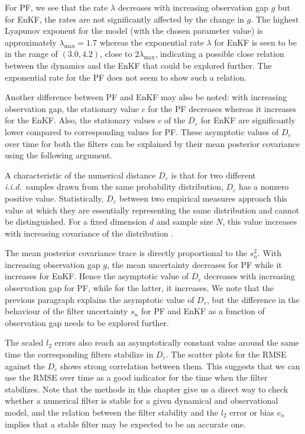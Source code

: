 For PF, we see that the rate $\lambda$ decreases with increasing observation gap $g$ but for EnKF, the rates are not significantly affected by the change in $g$. The highest Lyapunov exponent for the model (with the chosen parameter value) is approximately $\lambda_{\text{max}} = 1.7$ whereas the exponential rate $\lambda$ for EnKF is seen to be in the range of $(3.0, 4.2)$, close to $2 \lambda_{\text{max}}$, indicating a possible close relation between the dynamics and the EnKF that could be explored further. The exponential rate for the PF does not seem to show such a relation.

Another difference between PF and EnKF may also be noted: with increasing observation gap, the stationary value $c$ for the PF decreases whereas it increases for the EnKF. Also, the stationary values $c$ of the $D_\varepsilon$ for EnKF are significantly lower compared to corresponding values for PF. These asymptotic values of $D_\varepsilon$ over time for both the filters can be explained by their mean posterior covariance using the following argument.

A characteristic of the numerical distance $D_\varepsilon$ is that for two different {\it i.i.d.}~samples drawn from the same probability distribution, $D_\varepsilon$ has a nonzero positive value. Statistically, $D_\varepsilon$ between two empirical measures approach this value at which they are essentially representing the same distribution and cannot be distinguished. For a fixed dimension $d$ and sample size $N$, this value increases with increasing covariance of the distribution \cite[Figure~1 and discussion therein]{mandal2021stability}.

The mean posterior covariance trace is directly proportional to the $s_n^2$. With increasing observation gap $g$, the mean uncertainty decreases for PF while it increases for EnKF. Hence the asymptotic value of $D_\varepsilon$ decreases with increasing observation gap for PF, while for the latter, it increases. We note that the previous paragraph explains the asymptotic value of $D_\varepsilon$, but the difference in the behaviour of the filter uncertainty $s_n$ for PF and EnKF as a function of observation gap needs to be explored further.

The scaled $l_2$ errors also reach an asymptotically constant value around the same time the corresponding filters stabilize in $D_\varepsilon$. The scatter plots for the RMSE against the $D_\varepsilon$ shows strong correlation between them. This suggests that we can use the RMSE over time as a good indicator for the time when the filter stabilizes. Note that the methods in this chapter give us a direct way to check whether a numerical filter is stable for a given dynamical and observational model, and the relation between the filter stability and the $l_2$ error or bias $e_n$ implies that a stable filter may be expected to be an accurate one.

